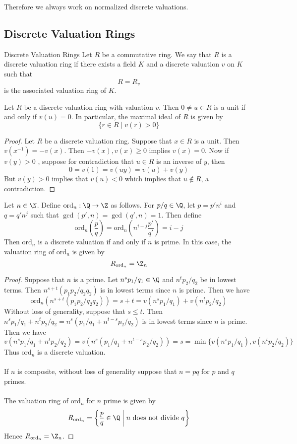 \documentclass[a4paper]{article}
\begin{document}
Therefore we always work on normalized discrete valuations. 

\subsection{Discrete Valuation Rings}
\begin{defn}{Discrete Valuation Rings}{} Let $R$ be a commutative ring. We say that $R$ is a discrete valuation ring if there exists a field $K$ and a discrete valuation $v$ on $K$ such that $$R=R_v$$ is the associated valuation ring of $K$. 
\end{defn}

\begin{lmm}{}{} Let $R$ be a discrete valuation ring with valuation $v$. Then $0\neq u\in R$ is a unit if and only if $v(u)=0$. In particular, the maximal ideal of $R$ is given by $$\{r\in R\;|\;v(r)>0\}$$ \tcbline
\begin{proof}
Let $R$ be a discrete valuation ring. Suppose that $x\in R$ is a unit. Then $v(x^{-1})=-v(x)$. Then $-v(x),v(x)\geq 0$ implies $v(x)=0$. Now if $v(y)>0$ , suppose for contradiction that $u\in R$ is an inverse of $y$, then $$0=v(1)=v(uy)=v(u)+v(y)$$ But $v(y)>0$ implies that $v(u)<0$ which implies that $u\notin R$, a contradiction. 
\end{proof}
\end{lmm}

\begin{eg}{}{} Let $n\in\N$. Define $\text{ord}_n:\Q\to\Z$ as follows. For $p/q\in\Q$, let $p=p'n^i$ and $q=q'n^j$ such that $\gcd(p',n)=\gcd(q',n)=1$. Then define $$\text{ord}_n\left(\frac{p}{q}\right)=\text{ord}_n\left(n^{i-j}\frac{p'}{q'}\right)=i-j$$ Then $\text{ord}_n$ is a discrete valuation if and only if $n$ is prime. In this case, the valuation ring of $\text{ord}_n$ is given by $$R_{\text{ord}_n}=\Z_n$$ \tcbline
\begin{proof}
Suppose that $n$ is a prime. Let $n^sp_1/q_1\in\Q$ and $n^tp_2/q_2$ be in lowest terms. Then $n^{s+t}(p_1p_2/q_2q_2)$ is in lowest terms since $n$ is prime. Then we have $$\text{ord}_n(n^{s+t}(p_1p_2/q_2q_2))=s+t=v(n^sp_1/q_1)+v(n^tp_2/q_2)$$ Without loss of generality, suppose that $s\leq t$. Then $n^sp_1/q_1+n^tp_2/q_2=n^s(p_1/q_1+n^{t-s}p_2/q_2)$ is in lowest terms since $n$ is prime. Then we have $$v(n^sp_1/q_1+n^tp_2/q_2)=v(n^s(p_1/q_1+n^{t-s}p_2/q_2))=s=\min\{v(n^sp_1/q_1), v(n^tp_2/q_2)\}$$ Thus $\text{ord}_n$ is a discrete valuation. \\~\\

If $n$ is composite, without loss of generality suppose that $n=pq$ for $p$ and $q$ primes. \\~\\

The valuation ring of $\text{ord}_n$ for $n$ prime is given by $$R_{\text{ord}_n}=\left\{\frac{p}{q}\in\Q\;\bigg{|}\;n\text{ does not divide }q\right\}$$ Hence $R_{\text{ord}_n}=\Z_n$. 
\end{proof}
\end{eg}
\end{document}
